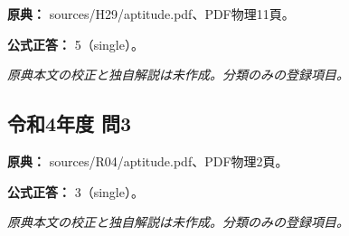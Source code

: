 \noindent\textbf{原典：} sources/H29/aptitude.pdf、PDF物理11頁。

\textbf{公式正答：} 5（single）。

\par\textit{原典本文の校正と独自解説は未作成。分類のみの登録項目。}

\subsection{令和4年度 問3}
\label{q:r04-reg-apt-03}

\noindent\textbf{原典：} sources/R04/aptitude.pdf、PDF物理2頁。

\textbf{公式正答：} 3（single）。

\par\textit{原典本文の校正と独自解説は未作成。分類のみの登録項目。}

